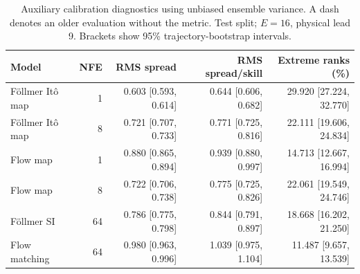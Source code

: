 \begin{table}[t]
\centering
\small
\setlength{\tabcolsep}{3pt}
\caption{Auxiliary calibration diagnostics using unbiased ensemble variance. A dash denotes an older evaluation without the metric. Test split; $E=16$, physical lead 9. Brackets show 95\% trajectory-bootstrap intervals.}
\label{tab:map-rms-calibration}
\begin{tabular}{lrrrr}
\toprule
Model & NFE & RMS spread & RMS spread/skill & Extreme ranks (\%) \\
\midrule
Föllmer Itô map & 1 & 0.603 [0.593, 0.614] & 0.644 [0.606, 0.682] & 29.920 [27.224, 32.770] \\
Föllmer Itô map & 8 & 0.721 [0.707, 0.733] & 0.771 [0.725, 0.816] & 22.111 [19.606, 24.834] \\
\addlinespace
Flow map & 1 & 0.880 [0.865, 0.894] & 0.939 [0.880, 0.997] & 14.713 [12.667, 16.994] \\
Flow map & 8 & 0.722 [0.706, 0.738] & 0.775 [0.725, 0.826] & 22.061 [19.549, 24.746] \\
\addlinespace
Föllmer SI & 64 & 0.786 [0.775, 0.798] & 0.844 [0.791, 0.897] & 18.668 [16.202, 21.250] \\
\addlinespace
Flow matching & 64 & 0.980 [0.963, 0.996] & 1.039 [0.975, 1.104] & 11.487 [9.657, 13.539] \\
\bottomrule
\end{tabular}
\end{table}
